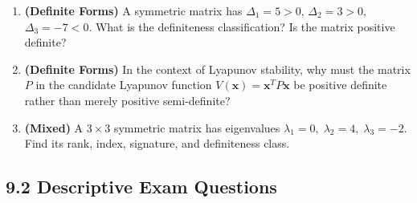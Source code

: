 \documentclass[12pt,a4paper]{article}
\begin{document}
\begin{enumerate}[label=\textbf{V\arabic*.}, leftmargin=*]
  \item \textbf{(Definite Forms)} A symmetric matrix has \(\Delta_1 = 5 > 0\),
        \(\Delta_2 = 3 > 0\), \(\Delta_3 = -7 < 0\). What is the definiteness
        classification? Is the matrix positive definite?

  \item \textbf{(Definite Forms)} In the context of Lyapunov stability, why must the matrix
        \(P\) in the candidate Lyapunov function \(V(\mathbf{x}) = \mathbf{x}^T P \mathbf{x}\)
        be positive definite rather than merely positive semi-definite?

  \item \textbf{(Mixed)} A \(3 \times 3\) symmetric matrix has eigenvalues
        \(\lambda_1 = 0,\; \lambda_2 = 4,\; \lambda_3 = -2\). Find its rank, index,
        signature, and definiteness class.
\end{enumerate}

\subsection*{9.2 Descriptive Exam Questions}
\end{document}
